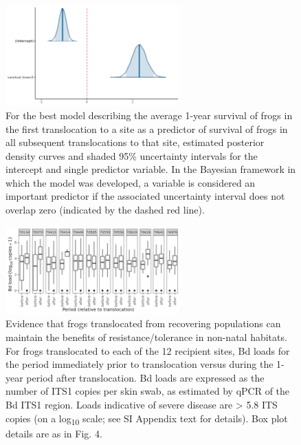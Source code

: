 \documentclass[9pt,twoside,lineno]{pnas-new}
\begin{document}
\begin{figure}

{\centering \includegraphics[width=0.60\textwidth]{figures/mcmc_areas_m2b.png}

}

\caption{\label{fig-transsurvival-postdens}For the best model describing
the average 1-year survival of frogs in the first translocation to a
site as a predictor of survival of frogs in all subsequent
translocations to that site, estimated posterior density curves and
shaded 95\% uncertainty intervals for the intercept and single predictor
variable. In the Bayesian framework in which the model was developed, a
variable is considered an important predictor if the associated
uncertainty interval does not overlap zero (indicated by the dashed red
line).}

\end{figure}\clearpage

\begin{figure}

{\centering \includegraphics[width=0.60\textwidth]{figures/bdload_beforeafter.png}

}

\caption{\label{fig-bdload-beforeafter}Evidence that frogs translocated
from recovering populations can maintain the benefits of
resistance/tolerance in non-natal habitats. For frogs translocated to
each of the 12 recipient sites, Bd loads for the period immediately
prior to translocation versus during the 1-year period after
translocation. Bd loads are expressed as the number of ITS1 copies per
skin swab, as estimated by qPCR of the Bd ITS1 region. Loads indicative
of severe disease are \textgreater{} 5.8 ITS copies (on a
log\textsubscript{10} scale; see SI Appendix text for details). Box plot
details are as in Fig. 4.}

\end{figure}\clearpage
\end{document}

